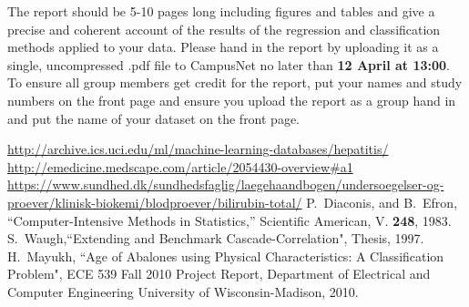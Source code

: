\documentclass[10pt, paper=a4]{article}
\begin{document}
The report should be 5-10 pages long including figures and tables and
give a precise and coherent account of the results of the regression
and classification methods applied to your data. Please hand in the
report by uploading it as a single, uncompressed .pdf file to
CampusNet no later than {\bf 12 April at 13:00}.  To ensure all group
members get credit for the report, put your names and study numbers on
the front page and ensure you upload the report as a group hand in and
put the name of your dataset on the front page.
\begin{thebibliography}{99}
  \url{http://archive.ics.uci.edu/ml/machine-learning-databases/hepatitis/}
  \url{http://emedicine.medscape.com/article/2054430-overview#a1}
  \url{https://www.sundhed.dk/sundhedsfaglig/laegehaandbogen/undersoegelser-og-proever/klinisk-biokemi/blodproever/bilirubin-total/}
 P.~Diaconis, and B.~Efron,
  ``Computer-Intensive Methods in Statistics,'' Scientific American,
  V. {\bf 248}, 1983.
   S.~Waugh,``Extending and Benchmark Cascade-Correlation", Thesis, 1997.
   H.~Mayukh, ``Age of Abalones using Physical Characteristics: A Classification Problem", ECE 539 Fall 2010 Project Report, Department of Electrical and Computer Engineering University of Wisconsin-Madison, 2010.
\end{thebibliography}
\end{document}
